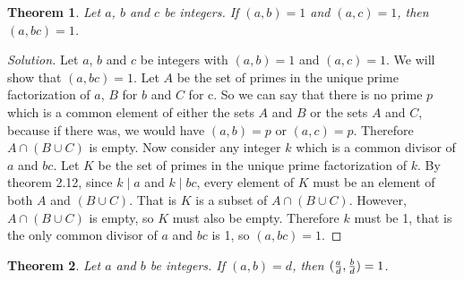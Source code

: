\documentclass[12pt,leqno]{article}
\numberwithin{equation}{section}
\newtheorem{thm}{Theorem}[section]
\theoremstyle{definition}
\begin{document}

\begin{thm}
Let $a$, $b$ and $c$ be integers.  If $(a, b) = 1$ and $(a, c) = 1$, then \\$(a, bc) = 1$.
\end{thm}

\begin{proof}[Solution]
Let $a$, $b$ and $c$ be integers with $(a, b) = 1$ and $(a, c) = 1$. We will show that $(a, bc) = 1$.  Let $A$ be the set of primes in the unique prime factorization of $a$, $B$ for $b$ and $C$ for c.  So we can say that there is no prime $p$ which is a common element of either the sets $A$ and $B$ or the sets $A$ and $C$, because if there was, we would have $(a, b) = p$ or $(a, c) = p$.  Therefore $A \cap (B \cup C)$ is empty.  Now consider any integer $k$ which is a common divisor of $a$ and $bc$.  Let $K$ be the set of primes in the unique prime factorization of $k$.  By theorem 2.12, since $k \mid a$ and $k \mid bc$, every element of $K$ must be an element of both $A$ and $(B \cup C)$.  That is $K$ is a subset of $A \cap (B \cup C)$.  However, $A \cap (B \cup C)$ is empty, so $K$ must also be empty.  Therefore $k$ must be 1, that is the only common divisor of $a$ and $bc$ is 1, so $(a, bc) = 1$.
\end{proof}


\begin{thm}
Let $a$ and $b$ be integers.  If $(a, b) = d$, then $({a \over d}, {b \over d}) = 1$.
\end{thm}
\end{document}
